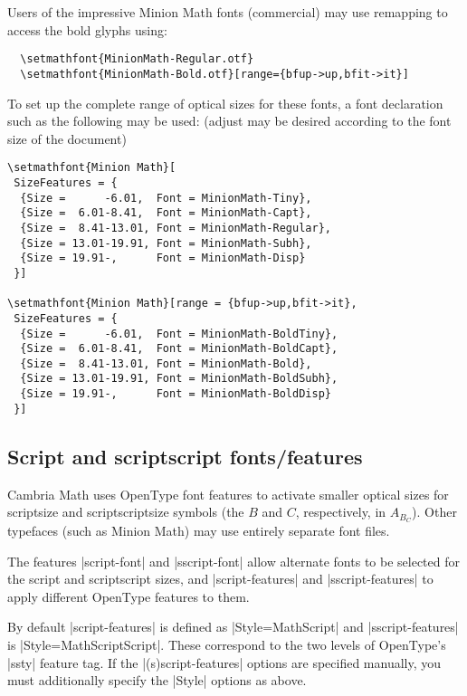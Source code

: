 
Users of the impressive Minion Math fonts (commercial) may use remapping to access the bold glyphs using:
\begin{Verbatim}
  \setmathfont{MinionMath-Regular.otf}
  \setmathfont{MinionMath-Bold.otf}[range={bfup->up,bfit->it}]
\end{Verbatim}
To set up the complete range of optical sizes for these fonts, a font declaration such as the following may be used: (adjust may be desired according to the font size of the document)
\begin{Verbatim}
\setmathfont{Minion Math}[
 SizeFeatures = {
  {Size =      -6.01,  Font = MinionMath-Tiny},
  {Size =  6.01-8.41,  Font = MinionMath-Capt},
  {Size =  8.41-13.01, Font = MinionMath-Regular},
  {Size = 13.01-19.91, Font = MinionMath-Subh},
  {Size = 19.91-,      Font = MinionMath-Disp}
 }]

\setmathfont{Minion Math}[range = {bfup->up,bfit->it},
 SizeFeatures = {
  {Size =      -6.01,  Font = MinionMath-BoldTiny},
  {Size =  6.01-8.41,  Font = MinionMath-BoldCapt},
  {Size =  8.41-13.01, Font = MinionMath-Bold},
  {Size = 13.01-19.91, Font = MinionMath-BoldSubh},
  {Size = 19.91-,      Font = MinionMath-BoldDisp}
 }]
\end{Verbatim}


\subsection{Script and scriptscript fonts/features}

Cambria Math uses OpenType font features to activate smaller optical sizes
for scriptsize and scriptscriptsize symbols (the $B$ and $C$, respectively,
in $A_{B_C}$).
Other typefaces (such as Minion Math) may use entirely separate font files.

The features |script-font| and |sscript-font| allow alternate fonts to be
selected for the script and scriptscript sizes, and |script-features| and
|sscript-features| to apply different OpenType features to them.

By default |script-features| is defined as |Style=MathScript| and |sscript-features| is |Style=MathScriptScript|.
These correspond to the two levels of OpenType's |ssty| feature tag.
If the |(s)script-features| options are specified manually, you must
additionally specify the |Style| options as above.


